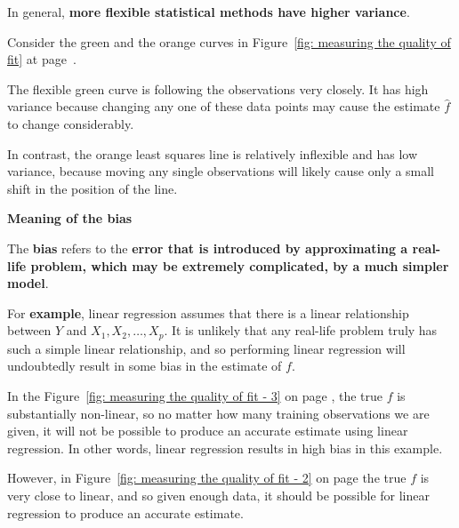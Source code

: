 \documentclass[a4paper]{article}
\newcommand{\definition}[1]{\textcolor{Red3}{\textbf{#1}}\index{#1}}
\newcommand{\example}[1]{\textcolor{Green4}{\textbf{#1}}}
\newcommand{\highspace}{\vspace{1.2em}\noindent}
\begin{document}
    \noindent
    In general, \textbf{more flexible statistical methods have higher variance}.

    \begin{examplebox}
        Consider the green and the orange curves in Figure~\ref{fig: measuring the quality of fit} at page~\pageref{fig: measuring the quality of fit}.
        
        \highspace
        The flexible green curve is following the observations very closely. It has high variance because changing any one of these data points may cause the estimate $\hat{f}$ to change considerably. 
        
        \highspace
        In contrast, the orange least squares line is relatively inflexible and has low variance, because moving any single observations will likely cause only a small shift in the position of the line.
    \end{examplebox}

    \newpage

    \begin{flushleft}
        \textcolor{Red2}{ \textbf{Meaning of the bias}}
    \end{flushleft}
    The \definition{bias} refers to the \textbf{error that is introduced by approximating a real-life problem, which may be extremely complicated, by a much simpler model}.

    \begin{examplebox}
        For \example{example}, linear regression assumes that there is a linear relationship between $Y$ and $X_{1}, X_{2}, \dots, X_{p}$. It is unlikely that any real-life problem truly has such a simple linear relationship, and so performing linear regression will undoubtedly result in some bias in the estimate of $f$.

        \highspace
        In the Figure~\ref{fig: measuring the quality of fit - 3} on page \pageref{fig: measuring the quality of fit - 3}, the true $f$ is substantially non-linear, so no matter how many training observations we are given, it will not be possible to produce an accurate estimate using linear regression. In other words, linear regression results in high bias in this example.

        \highspace
        However, in Figure~\ref{fig: measuring the quality of fit - 2} on page \pageref{fig: measuring the quality of fit - 2} the true $f$ is very close to linear, and so given enough data, it should be possible for linear regression to produce an accurate estimate.
    \end{examplebox}
\end{document}
